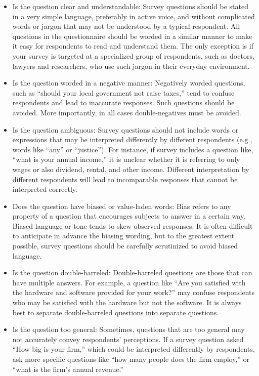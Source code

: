 \begin{itemize}
	\item Is the question clear and understandable: Survey questions should be stated in a very simple language, preferably in active voice, and without complicated words or jargon that may not be understood by a typical respondent. All questions in the questionnaire 	should be worded in a similar manner to make it easy for respondents to read and 	understand them. The only exception is if your survey is targeted at a specialized group of respondents, such as doctors, lawyers and researchers, who use such jargon in their everyday environment.

	\item Is the question worded in a negative manner: Negatively worded questions, such as ``should your local government not raise taxes,'' tend to confuse respondents and lead to inaccurate responses. Such questions should be avoided. More importantly, in all cases double-negatives must be avoided.

	\item Is the question ambiguous: Survey questions should not include words or expressions that may be interpreted differently by different respondents (e.g., words like ``any'' or ``justice''). For instance, if survey includes a question like, ``what is your annual income,'' it is unclear whether it is referring to only wages or also dividend, rental, and other income. Different interpretation by different respondents will lead to incomparable responses that cannot be interpreted correctly.

	\item Does the question have biased or value-laden words: Bias refers to any property of a question that encourages subjects to answer in a certain way. Biased language or tone tends to skew observed responses. It is often difficult to anticipate in advance the biasing wording, but to the greatest extent possible, survey questions should be carefully scrutinized to avoid biased language.

	\item Is the question double-barreled: Double-barreled questions are those that can have multiple answers. For example, a question like ``Are you satisfied with the hardware and software provided for your work?'' may confuse respondents who may be satisfied with the hardware but not the software. It is always best to separate double-barreled questions into separate questions.

	\item Is the question too general: Sometimes, questions that are too general may not accurately convey respondents' perceptions. If a survey question asked ``How big is your firm,'' which could be interpreted differently by respondents, ask more specific questions like ``how many people does the firm employ,'' or ``what is the firm's annual revenue.''


\end{itemize}
